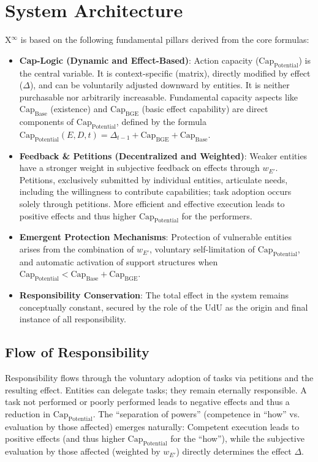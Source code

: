 \documentclass[12pt]{scrartcl}
\begin{document}
\section{System Architecture}
X$^\infty$ is based on the following fundamental pillars derived from the core formulas:
\begin{itemize}
    \item \textbf{Cap-Logic (Dynamic and Effect-Based)}: Action capacity ($\text{Cap}_{\text{Potential}}$) is the central variable. It is context-specific (matrix), directly modified by effect ($\Delta$), and can be voluntarily adjusted downward by entities. It is neither purchasable nor arbitrarily increasable. Fundamental capacity aspects like $\text{Cap}_{\text{Base}}$ (existence) and $\text{Cap}_{\text{BGE}}$ (basic effect capability) are direct components of $\text{Cap}_{\text{Potential}}$, defined by the formula $\text{Cap}_{\text{Potential}}(E,D,t) = \Delta_{t-1} + \text{Cap}_{\text{BGE}} + \text{Cap}_{\text{Base}}$.
    \item \textbf{Feedback \& Petitions (Decentralized and Weighted)}: Weaker entities have a stronger weight in subjective feedback on effects through $w_{E'}$. Petitions, exclusively submitted by individual entities, articulate needs, including the willingness to contribute capabilities; task adoption occurs solely through petitions. More efficient and effective execution leads to positive effects and thus higher $\text{Cap}_{\text{Potential}}$ for the performers.
    \item \textbf{Emergent Protection Mechanisms}: Protection of vulnerable entities arises from the combination of $w_{E'}$, voluntary self-limitation of $\text{Cap}_{\text{Potential}}$, and automatic activation of support structures when $\text{Cap}_{\text{Potential}} < \text{Cap}_{\text{Base}} + \text{Cap}_{\text{BGE}}$.
    \item \textbf{Responsibility Conservation}: The total effect in the system remains conceptually constant, secured by the role of the UdU as the origin and final instance of all responsibility.
\end{itemize}

\subsection{Flow of Responsibility}
\label{sec:FlussDerVerantwortung}
Responsibility flows through the voluntary adoption of tasks via petitions and the resulting effect. Entities can delegate tasks; they remain eternally responsible. A task not performed or poorly performed leads to negative effects and thus a reduction in $\text{Cap}_{\text{Potential}}$. The “separation of powers” (competence in “how” vs. evaluation by those affected) emerges naturally: Competent execution leads to positive effects (and thus higher $\text{Cap}_{\text{Potential}}$ for the “how”), while the subjective evaluation by those affected (weighted by $w_{E'}$) directly determines the effect $\Delta$.
\end{document}
